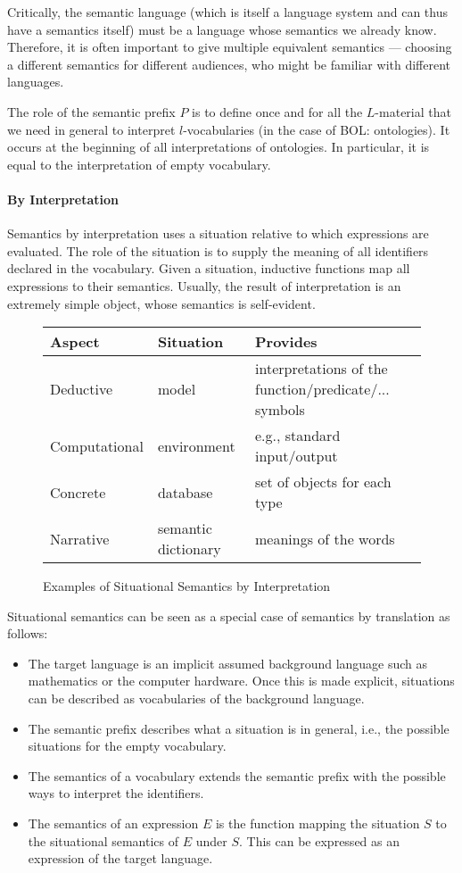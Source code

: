 Critically, the semantic language (which is itself a language system and can thus have a semantics itself) must be a language whose semantics we already know.
Therefore, it is often important to give multiple equivalent semantics --- choosing a different semantics for different audiences, who might be familiar with different languages.

The role of the semantic prefix $P$ is to define once and for all the $L$-material that we need in general to interpret $l$-vocabularies (in the case of BOL: ontologies).
It occurs at the beginning of all interpretations of ontologies.
In particular, it is equal to the interpretation of empty vocabulary.

\paragraph{By Interpretation}
Semantics by interpretation uses a situation relative to which expressions are evaluated.
The role of the situation is to supply the meaning of all identifiers declared in the vocabulary.
Given a situation, inductive functions map all expressions to their semantics.
Usually, the result of interpretation is an extremely simple object, whose semantics is self-evident.

\begin{figure}[hbt]
\begin{tabular}{l|ll}
Aspect & Situation & Provides\\\hline
Deductive & model & interpretations of the function/predicate/... symbols\\
Computational & environment & e.g., standard input/output \\
Concrete & database & set of objects for each type \\
Narrative & semantic dictionary & meanings of the words \\
\end{tabular}
\caption{Examples of Situational Semantics by Interpretation}\label{fig:sit}
\end{figure}

Situational semantics can be seen as a special case of semantics by translation as follows:
\begin{itemize}
\item The target language is an implicit assumed background language such as mathematics or the computer hardware.
Once this is made explicit, situations can be described as vocabularies of the background language.
\item The semantic prefix describes what a situation is in general, i.e., the possible situations for the empty vocabulary.
\item The semantics of a vocabulary extends the semantic prefix with the possible ways to interpret the identifiers.
\item The semantics of an expression $E$ is the function mapping the situation $S$ to the situational semantics of $E$ under $S$. This can be expressed as an expression of the target language.
\end{itemize}


